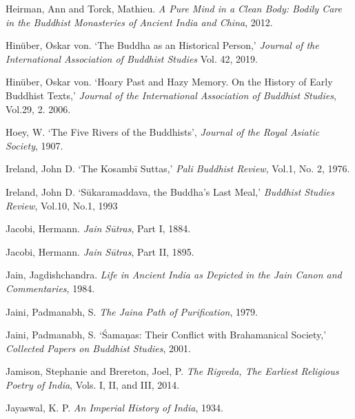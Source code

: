 \label{footprints_split_022.html_Heirmanux20andux20Torckux202012}
Heirman, Ann and Torck, Mathieu. \emph{A Pure Mind in a Clean Body:
Bodily Care in the Buddhist Monasteries of Ancient India and China},
2012.

Hinüber, Oskar von. `The Buddha as an Historical Person,' \emph{Journal
of the International Association of Buddhist Studies} Vol. 42, 2019.

\label{footprints_split_022.html_Hinuxfcberux202006}
Hinüber, Oskar von. `Hoary Past and Hazy Memory. On the History of Early
Buddhist Texts,' \emph{Journal of the International Association of
Buddhist Studies}, Vol.29, 2. 2006.

\label{footprints_split_022.html_Hoeyux201907}
Hoey, W. `The Five Rivers of the Buddhists', \emph{Journal of the Royal
Asiatic Society}, 1907.

\label{footprints_split_022.html_Irelandux201976}
Ireland, John D. `The Kosambī Suttas,' \emph{Pali Buddhist Review},
Vol.1, No. 2, 1976.

\label{footprints_split_022.html_Irelandux201993}
Ireland, John D. `Sūkaramaddava, the Buddha's Last Meal,' \emph{Buddhist
Studies Review}, Vol.10, No.1, 1993

\label{footprints_split_022.html_Jacobiux201884}
Jacobi, Hermann. \emph{Jain Sūtras}, Part I, 1884.

\label{footprints_split_022.html_Jacobiux201895}
Jacobi, Hermann. \emph{Jain Sūtras}, Part II, 1895.

\label{footprints_split_022.html_Jainux20Jux201984}
Jain, Jagdishchandra. \emph{Life in Ancient India as Depicted in the
Jain Canon and Commentaries}, 1984.

\label{footprints_split_022.html_Jainiux20PSux201979}
Jaini, Padmanabh, S. \emph{The Jaina Path of Purification}, 1979.

\label{footprints_split_022.html_Jainiux20PSux202001}
Jaini, Padmanabh, S. `Śamaṇas: Their Conflict with Brahamanical
Society,' \emph{Collected Papers on Buddhist Studies}, 2001.

\label{footprints_split_022.html_Jamisonux20Breretonux202014}
Jamison, Stephanie and Brereton, Joel, P. \emph{The Rigveda, The
Earliest Religious Poetry of India}, Vols. I, II, and III, 2014.

\label{footprints_split_022.html_Jayaswalux201934}
Jayaswal, K. P. \emph{An Imperial History of India}, 1934.

